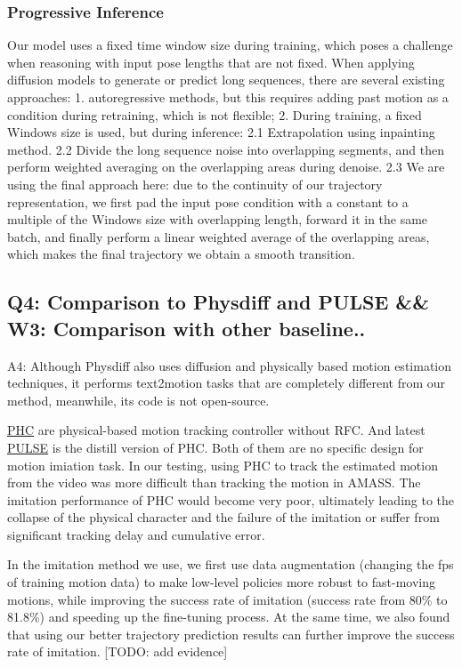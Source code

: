 \documentclass{article}
\begin{document}
\subsubsection{Progressive Inference}\label{progressive-inference}

Our model uses a fixed time window size during training, which poses a challenge when reasoning with input pose lengths that are not fixed. When applying diffusion models to generate or predict long sequences, there are several existing approaches: 1. autoregressive methods, but this requires adding past motion as a condition during retraining, which is not flexible; 2. During training, a fixed Windows size is used, but during inference: 2.1 Extrapolation using inpainting method. 2.2 Divide the long sequence noise into overlapping segments, and then perform weighted averaging on the overlapping areas during denoise. 2.3 We are using the final approach here: due to the continuity of our trajectory representation, we first pad the input pose condition with a constant to a multiple of the Windows size with overlapping length, forward it in the same batch, and finally perform a linear weighted average of the overlapping areas, which makes the final trajectory we obtain a smooth transition.

\subsection{Q4: Comparison to Physdiff and PULSE \&\& W3: Comparison with other baseline..}\label{q4-comparison-to-physdiff-and-pulse-w3-comparison-with-other-baseline..}

A4: Although Physdiff also uses diffusion and physically based motion estimation techniques, it performs text2motion tasks that are completely different from our method, meanwhile, its code is not open-source.

\href{https://github.com/ZhengyiLuo/PHC}{PHC} are physical-based motion tracking controller without RFC. And latest \href{https://github.com/ZhengyiLuo/PULSE}{PULSE} is the distill version of PHC. Both of them are no specific design for motion imiation task. In our testing, using PHC to track the estimated motion from the video was more difficult than tracking the motion in AMASS. The imitation performance of PHC would become very poor, ultimately leading to the collapse of the physical character and the failure of the imitation or suffer from significant tracking delay and cumulative error.

In the imitation method we use, we first use data augmentation (changing the fps of training motion data) to make low-level policies more robust to fast-moving motions, while improving the success rate of imitation (success rate from 80\% to 81.8\%) and speeding up the fine-tuning process. At the same time, we also found that using our better trajectory prediction results can further improve the success rate of imitation. {[}TODO: add evidence{]}
\end{document}
